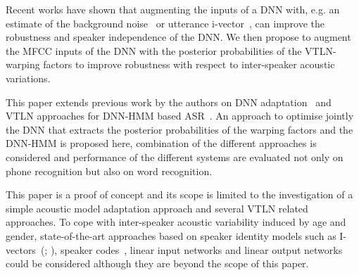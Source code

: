 \documentclass{nle}
\begin{document}
Recent  works have shown  that augmenting  the inputs  of a  DNN with,
e.g.  an  estimate  of  the background  noise~\citep*{export:194344}  or
utterance  i-vector~\citep*{42536},  can   improve  the  robustness  and
speaker independence of  the DNN. We then propose  to augment the MFCC
inputs of the DNN with the posterior probabilities of the VTLN-warping
factors to  improve robustness with respect  to inter-speaker acoustic
variations.

This   paper  extends   previous  work   by  the   authors   on  DNN
adaptation~\citep{SerGiu2014}      and      VTLN     approaches      for
DNN-HMM based ASR~\citep*{SerGiu2014a}.  An approach to  optimise jointly  the DNN
that extracts the posterior probabilities of  the warping factors and the DNN-HMM is
proposed here,  combination of the different  approaches is considered
and performance of the different systems are evaluated not only on phone
recognition but also on word recognition. 

%
%
This  paper is a  proof of  concept and  its scope  is limited  to the
investigation  of  a simple acoustic  model  adaptation approach  and
several VTLN related  approaches.  To cope with inter-speaker acoustic variability induced by 
age and gender, state-of-the-art approaches
based      on      speaker      identity      models      such      as
I-vectors~(\citealp*{dehak2011front,saon2013speaker};
\citealp{42536}),  speaker codes~\citep*{abdel2013fast},  linear input
networks  and  linear  output  networks~\citep*{li2010comparison}  could be considered 
although they are beyond the scope of this paper.

\end{document}
